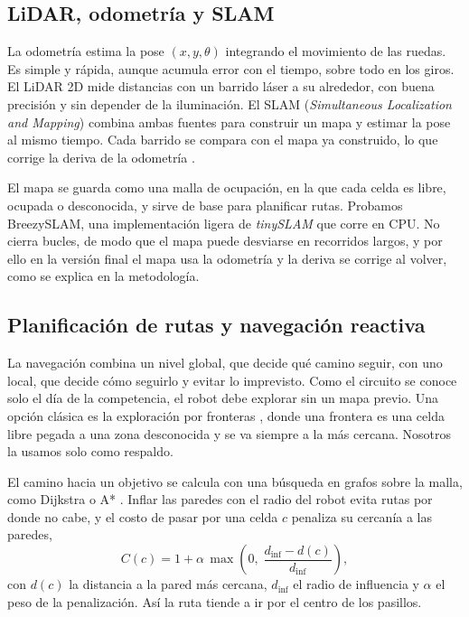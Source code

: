 \documentclass[11pt,a4paper]{article}
\begin{document}
\subsection{LiDAR, odometría y SLAM}

La odometría estima la pose $(x, y, \theta)$ integrando el movimiento de las ruedas. Es simple y rápida, aunque acumula error con el tiempo, sobre todo en los giros. El LiDAR 2D mide distancias con un barrido láser a su alrededor, con buena precisión y sin depender de la iluminación. El SLAM (\textit{Simultaneous Localization and Mapping}) combina ambas fuentes para construir un mapa y estimar la pose al mismo tiempo. Cada barrido se compara con el mapa ya construido, lo que corrige la deriva de la odometría \cite{thrun2005}.

El mapa se guarda como una malla de ocupación, en la que cada celda es libre, ocupada o desconocida, y sirve de base para planificar rutas. Probamos BreezySLAM, una implementación ligera de \textit{tinySLAM} \cite{steux2010} que corre en CPU. No cierra bucles, de modo que el mapa puede desviarse en recorridos largos, y por ello en la versión final el mapa usa la odometría y la deriva se corrige al volver, como se explica en la metodología.

\subsection{Planificación de rutas y navegación reactiva}

La navegación combina un nivel global, que decide qué camino seguir, con uno local, que decide cómo seguirlo y evitar lo imprevisto. Como el circuito se conoce solo el día de la competencia, el robot debe explorar sin un mapa previo. Una opción clásica es la exploración por fronteras \cite{yamauchi1997}, donde una frontera es una celda libre pegada a una zona desconocida y se va siempre a la más cercana. Nosotros la usamos solo como respaldo.

El camino hacia un objetivo se calcula con una búsqueda en grafos sobre la malla, como Dijkstra \cite{dijkstra1959} o A* \cite{hart1968}. Inflar las paredes con el radio del robot evita rutas por donde no cabe, y el costo de pasar por una celda $c$ penaliza su cercanía a las paredes,
\begin{equation}
  C(c) = 1 + \alpha \,\max\!\left(0,\; \frac{d_{\mathrm{inf}} - d(c)}{d_{\mathrm{inf}}}\right),
\end{equation}
con $d(c)$ la distancia a la pared más cercana, $d_{\mathrm{inf}}$ el radio de influencia y $\alpha$ el peso de la penalización. Así la ruta tiende a ir por el centro de los pasillos.
\end{document}
